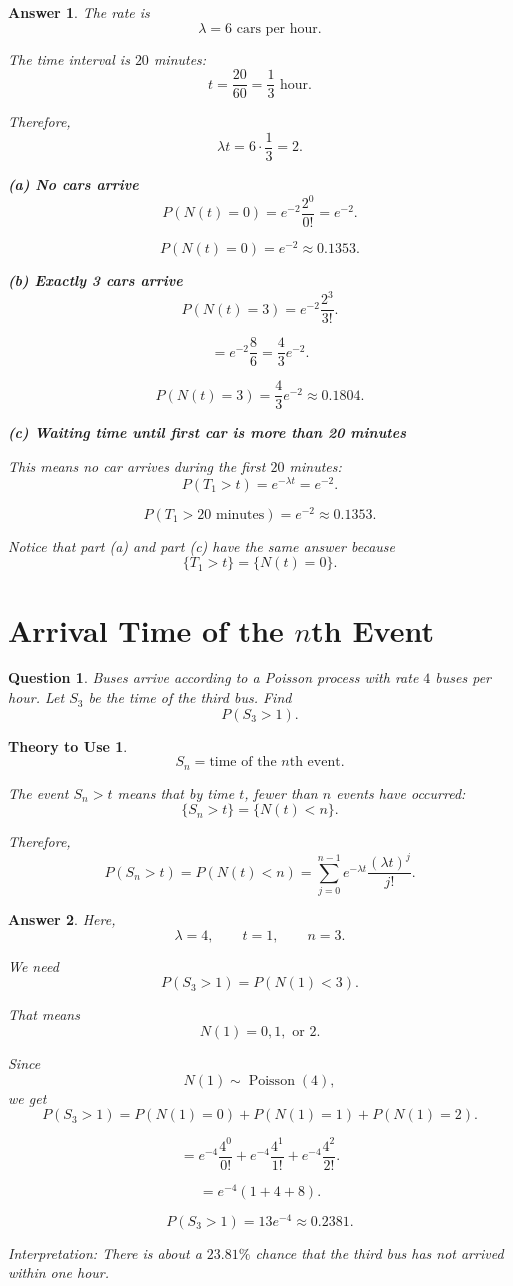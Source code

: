 \documentclass[12pt]{article}
\newtheorem{question}{Question}
\newtheorem*{theory}{Theory to Use}
\newtheorem*{answer}{Answer}
\begin{document}
\begin{answer}
The rate is
\[
\lambda=6 \text{ cars per hour}.
\]

The time interval is \(20\) minutes:
\[
t=\frac{20}{60}=\frac{1}{3}\text{ hour}.
\]

Therefore,
\[
\lambda t=6\cdot \frac{1}{3}=2.
\]

\textbf{(a) No cars arrive}
\[
P(N(t)=0)=e^{-2}\frac{2^0}{0!}=e^{-2}.
\]

\[
\boxed{P(N(t)=0)=e^{-2}\approx 0.1353.}
\]

\textbf{(b) Exactly 3 cars arrive}
\[
P(N(t)=3)=e^{-2}\frac{2^3}{3!}.
\]

\[
=e^{-2}\frac{8}{6}
=\frac{4}{3}e^{-2}.
\]

\[
\boxed{P(N(t)=3)=\frac{4}{3}e^{-2}\approx 0.1804.}
\]

\textbf{(c) Waiting time until first car is more than 20 minutes}

This means no car arrives during the first \(20\) minutes:
\[
P(T_1>t)=e^{-\lambda t}=e^{-2}.
\]

\[
\boxed{P(T_1>20\text{ minutes})=e^{-2}\approx 0.1353.}
\]

Notice that part (a) and part (c) have the same answer because
\[
\{T_1>t\}=\{N(t)=0\}.
\]
\end{answer}

\section{Arrival Time of the \(n\)th Event}

\begin{question}
Buses arrive according to a Poisson process with rate \(4\) buses per hour.
Let \(S_3\) be the time of the third bus.
Find
\[
P(S_3>1).
\]
\end{question}

\begin{theory}
\[
S_n=\text{time of the }n\text{th event}.
\]

The event \(S_n>t\) means that by time \(t\), fewer than \(n\) events have occurred:
\[
\{S_n>t\}=\{N(t)<n\}.
\]

Therefore,
\[
P(S_n>t)=P(N(t)<n)
=\sum_{j=0}^{n-1}e^{-\lambda t}\frac{(\lambda t)^j}{j!}.
\]
\end{theory}

\begin{answer}
Here,
\[
\lambda=4,\qquad t=1,\qquad n=3.
\]

We need
\[
P(S_3>1)=P(N(1)<3).
\]

That means
\[
N(1)=0,1,\text{ or }2.
\]

Since
\[
N(1)\sim \operatorname{Poisson}(4),
\]
we get
\[
P(S_3>1)=P(N(1)=0)+P(N(1)=1)+P(N(1)=2).
\]

\[
=e^{-4}\frac{4^0}{0!}
+e^{-4}\frac{4^1}{1!}
+e^{-4}\frac{4^2}{2!}.
\]

\[
=e^{-4}\left(1+4+8\right).
\]

\[
\boxed{P(S_3>1)=13e^{-4}\approx 0.2381.}
\]

Interpretation: There is about a \(23.81\%\) chance that the third bus has not arrived within one hour.
\end{answer}
\end{document}
